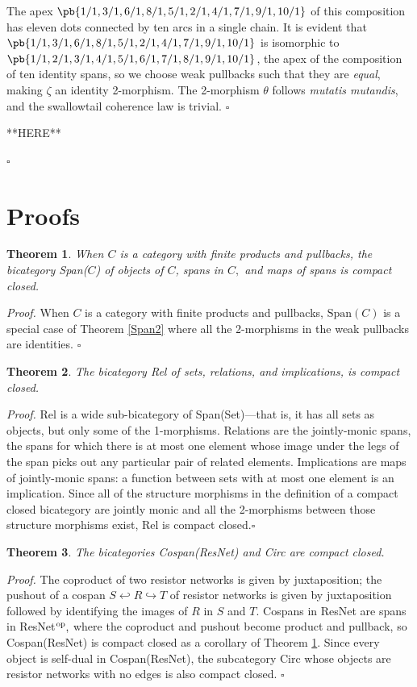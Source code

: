 \documentclass[12pt,twoside,openright]{report}
\newtheorem{thm}{Theorem}
\newcommand{\op}{{\rm op}}
\newcommand{\Span}{\mbox{Span}}
\begin{document}
The apex $\pb{1/1,3/1,6/1,8/1,5/1,2/1,4/1,7/1,9/1,10/1}$ of this composition has eleven dots connected by ten arcs in a single chain.  It is evident that $\pb{1/1,3/1,6/1,8/1,5/1,2/1,4/1,7/1,9/1,10/1}$ is isomorphic to $\pb{1/1,2/1,3/1,4/1,5/1,6/1,7/1,8/1,9/1,10/1}$, the apex of the composition of ten identity spans, so we choose weak pullbacks such that they are {\em equal}, making $\zeta$ an identity 2-morphism.  The 2-morphism $\theta$ follows {\em mutatis mutandis}, and the swallowtail coherence law is trivial. \hfill $\square$

**HERE**

\hfill $\square$

\section{Proofs}
\label{proofs}
\begin{thm}
  \label{span}
  When $C$ is a category with finite products and pullbacks, the bicategory Span($C$) of objects of $C$, spans in $C,$ and maps of spans is compact closed.
\end{thm}
{\em Proof.} When $C$ is a category with finite products and pullbacks,
$\Span(C)$ is a special case of Theorem \ref{Span2} where all the
2-morphisms in the weak pullbacks are identities. \hfill $\square$

\begin{thm}
  The bicategory Rel of sets, relations, and implications, is compact closed.
\end{thm}
{\em Proof.} Rel is a wide sub-bicategory of Span(Set)---that is, it has all sets as objects, but only some of the 1-morphisms.  Relations are the jointly-monic spans, the spans for which there is at most one element whose image under the legs of the span picks out any particular pair of related elements.  Implications are maps of jointly-monic spans:
a function between sets with at most one element is an implication. Since all of the structure morphisms in the definition of a compact closed bicategory are jointly monic and all the 2-morphisms between those structure morphisms exist, Rel is compact closed.\hfill $\square$

\begin{thm}
  The bicategories Cospan(ResNet) and Circ are compact closed.
\end{thm}
{\em Proof.} The coproduct of two resistor networks is given by juxtaposition; the pushout of a cospan $S \hookleftarrow R
\hookrightarrow T$ of resistor networks is given by juxtaposition followed by identifying the images of $R$ in $S$ and $T$.  Cospans in ResNet are spans in ResNet${}^{\op},$ where the coproduct and pushout become product and pullback, so Cospan(ResNet) is compact closed as a corollary of Theorem \ref{span}.  Since every object is self-dual in Cospan(ResNet), the subcategory Circ whose objects are resistor networks with no edges is also compact closed. \hfill $\square$
\end{document}
